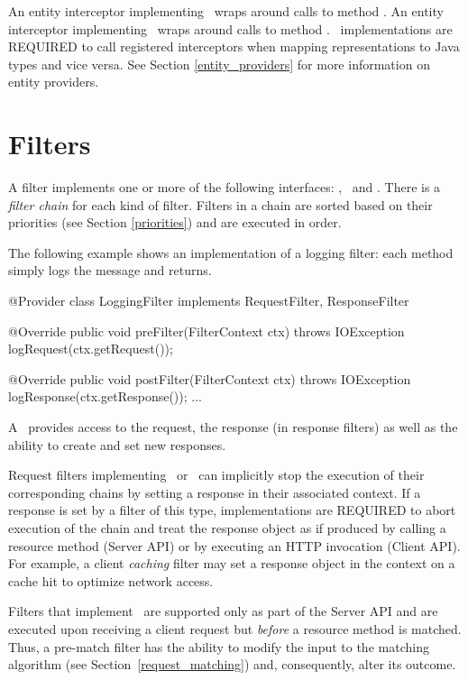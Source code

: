 An entity interceptor implementing \ReaderInterceptor\ wraps around calls to  method . An entity interceptor implementing \WriterInterceptor\ wraps around calls to  method . \jaxrs\ implementations are REQUIRED to call registered interceptors when mapping representations to Java types and vice versa. See Section \ref{entity_providers} for more information on entity providers.

\section{Filters}
\label{filters}

A filter implements one or more of the following interfaces:  \RequestFilter, \PreMatchRequestFilter\ and \ResponseFilter. There is a \emph{filter chain} for each kind of filter. Filters in a chain are sorted based on their priorities (see Section \ref{priorities}) and are executed in order. 


The following example shows an implementation of a logging filter: each method simply logs the message and returns.

\begin{listing}{1}
@Provider
class LoggingFilter implements RequestFilter, ResponseFilter {

    @Override
    public void preFilter(FilterContext ctx) throws IOException {
        logRequest(ctx.getRequest());
    }

    @Override
    public void postFilter(FilterContext ctx) throws IOException {
        logResponse(ctx.getResponse());
    }
    ...
}
\end{listing}

A \FilterContext\ provides access to the request, the response (in response filters) as well as the ability to create and set new responses.

Request filters implementing \RequestFilter\ or \PreMatchRequestFilter\ can implicitly stop the execution of their corresponding chains by setting a response in their associated context. If a response is set by a filter of this type, implementations are REQUIRED to abort execution of the chain and treat the response object as if produced by calling a resource method (Server API) or by executing an HTTP invocation (Client API). For example, a client {\em caching} filter may set a response object in the context on a cache hit to optimize network access.

Filters that implement \PreMatchRequestFilter\ are supported only as part of the Server API and are executed upon receiving a client request but {\em before} a resource method is matched. Thus, a pre-match filter has the ability to modify the input to the matching algorithm (see Section~\ref{request_matching}) and, consequently, alter its outcome. 

